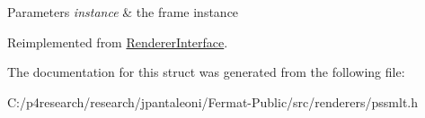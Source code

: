 \begin{DoxyParams}{Parameters}
{\em instance} & the frame instance \\
\hline
\end{DoxyParams}


Reimplemented from \hyperlink{struct_renderer_interface_aa64254dd44c94929b05092dc8d74f29d}{Renderer\+Interface}.



The documentation for this struct was generated from the following file\+:\begin{DoxyCompactItemize}
\item 
C\+:/p4research/research/jpantaleoni/\+Fermat-\/\+Public/src/renderers/pssmlt.\+h\end{DoxyCompactItemize}
